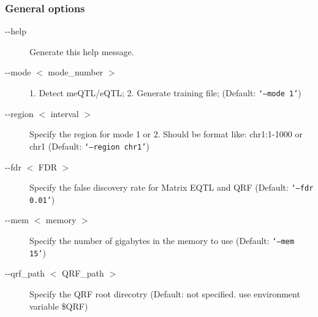 \documentclass[12pt]{article}
\begin{document}
{\color{blue}\subsubsection{General options}}
\begin{description}
\item[-{}-help] Generate this help message.

\item[-{}-mode \begin{math}<\end{math} mode\_number \begin{math}>\end{math}]  1. Detect meQTL/eQTL; 2. Generate training file; (Default: {\tt `--mode 1'})

\item[-{}-region \begin{math}<\end{math} interval \begin{math}>\end{math}]  Specify the region for mode 1 or 2. Should be format like: chr1:1-1000 or chr1 (Default: {\tt `--region chr1'})

\item[-{}-fdr \begin{math}<\end{math} FDR \begin{math}>\end{math}]  Specify the false discovery rate for Matrix EQTL and QRF (Default: {\tt `--fdr 0.01'})

\item[-{}-mem \begin{math}<\end{math} memory \begin{math}>\end{math}]  Specify the number of gigabytes in the memory to use (Default: {\tt `--mem 15'})

\item[-{}-qrf\_path \begin{math}<\end{math} QRF\_path \begin{math}>\end{math}]  Specify the QRF root direcotry (Default: not specified. use environment variable \$QRF)


\end{description}
\end{document}
